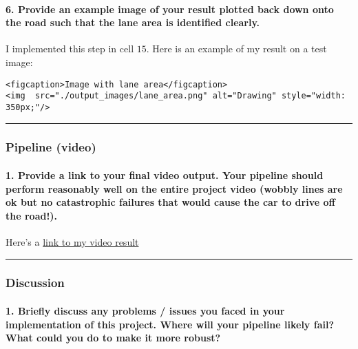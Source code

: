 \documentclass[11pt]{article}
\begin{document}
\paragraph{6. Provide an example image of your result plotted back down
onto the road such that the lane area is identified
clearly.}\label{provide-an-example-image-of-your-result-plotted-back-down-onto-the-road-such-that-the-lane-area-is-identified-clearly.}

I implemented this step in cell \(15\). Here is an example of my result
on a test image:

\begin{verbatim}
<figcaption>Image with lane area</figcaption>
<img  src="./output_images/lane_area.png" alt="Drawing" style="width: 350px;"/>
\end{verbatim}

\begin{center}\rule{0.5\linewidth}{\linethickness}\end{center}

\subsubsection{Pipeline (video)}\label{pipeline-video}

\paragraph{1. Provide a link to your final video output. Your pipeline
should perform reasonably well on the entire project video (wobbly lines
are ok but no catastrophic failures that would cause the car to drive
off the
road!).}\label{provide-a-link-to-your-final-video-output.-your-pipeline-should-perform-reasonably-well-on-the-entire-project-video-wobbly-lines-are-ok-but-no-catastrophic-failures-that-would-cause-the-car-to-drive-off-the-road.}

Here's a \href{./output_videos/final_video.mp4}{link to my video result}

\begin{center}\rule{0.5\linewidth}{\linethickness}\end{center}

\subsubsection{Discussion}\label{discussion}

\paragraph{1. Briefly discuss any problems / issues you faced in your
implementation of this project. Where will your pipeline likely fail?
What could you do to make it more
robust?}\label{briefly-discuss-any-problems-issues-you-faced-in-your-implementation-of-this-project.-where-will-your-pipeline-likely-fail-what-could-you-do-to-make-it-more-robust}
\end{document}
